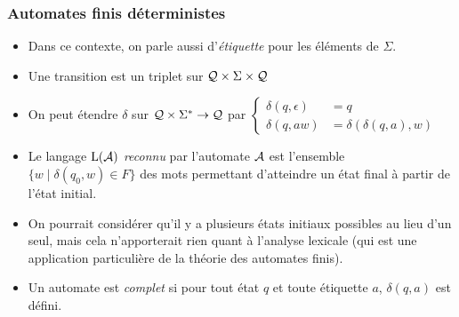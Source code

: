 %
\begin{frame}
\frametitle{Automates finis déterministes}


\begin{itemize}

  \item Dans ce contexte, on parle aussi d'\emph{étiquette} pour les
  éléments de $\Sigma$.

  \item Une transition est un triplet sur ${\cal Q} \times \Sigma
  \times {\cal Q}$

  \item On peut étendre $\delta$ sur ${\cal Q} \times \Sigma^{*}
  \rightarrow {\cal Q}$ par
   $\left\{
     \begin{aligned}
        \delta (q,\epsilon) &= q\\
        \delta (q, aw) &= \delta (\delta (q,a),w)
     \end{aligned}
   \right.$

  \item Le langage $\mathrm{L}({\cal A})$ \emph{reconnu} par
  l'automate ${\cal A}$ est l'ensemble $\{w \mid \delta(q_0,w) \in
  F\}$ des mots permettant d'atteindre un état final à partir de
  l'état initial.

  \item On pourrait considérer qu'il y a plusieurs états initiaux
  possibles au lieu d'un seul, mais cela n'apporterait rien quant à
  l'analyse lexicale (qui est une application particulière de la
  théorie des automates finis).

  \item Un automate est \emph{complet} si pour tout état $q$ et toute
  étiquette $a$, $\delta(q,a)$ est défini.

\end{itemize}

\end{frame}


